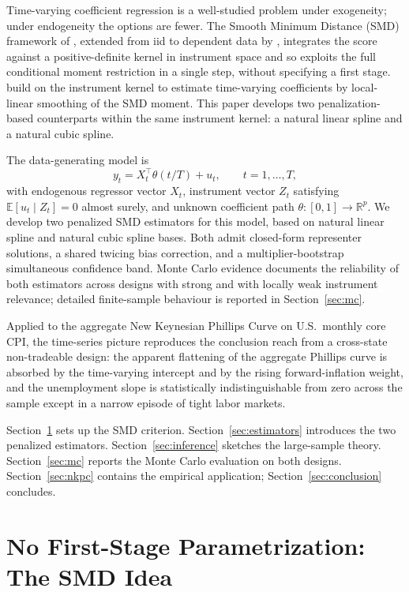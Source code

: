 \documentclass[12pt]{article}
\newcommand{\R}{\mathbb{R}}
\newcommand{\E}{\mathbb{E}}
\begin{document}
Time-varying coefficient regression is a well-studied problem under exogeneity; under endogeneity the options are fewer. The Smooth Minimum Distance (SMD) framework of \citet{Bierens1982}, extended from iid to dependent data by \citet{AntoineSun2024}, integrates the score against a positive-definite kernel in instrument space and so exploits the full conditional moment restriction in a single step, without specifying a first stage. \citet{AntoineShahryarpoor} build on the instrument kernel to estimate time-varying coefficients by local-linear smoothing of the SMD moment. This paper develops two penalization-based counterparts within the same instrument kernel: a natural linear spline and a natural cubic spline.

The data-generating model is
\begin{equation}\label{eq:model}
  y_t = X_t^\top \theta(t/T) + u_t, \qquad t = 1,\ldots,T,
\end{equation}
with endogenous regressor vector $X_t$, instrument vector $Z_t$ satisfying $\E[u_t \mid Z_t] = 0$ almost surely, and unknown coefficient path $\theta : [0,1] \to \R^p$. We develop two penalized SMD estimators for this model, based on natural linear spline and natural cubic spline bases. Both admit closed-form representer solutions, a shared twicing bias correction, and a multiplier-bootstrap simultaneous confidence band. Monte Carlo evidence documents the reliability of both estimators across designs with strong and with locally weak instrument relevance; detailed finite-sample behaviour is reported in Section~\ref{sec:mc}.

Applied to the aggregate New Keynesian Phillips Curve on U.S.\ monthly core CPI, the time-series picture reproduces the conclusion \citet{Hazell2022} reach from a cross-state non-tradeable design: the apparent flattening of the aggregate Phillips curve is absorbed by the time-varying intercept and by the rising forward-inflation weight, and the unemployment slope is statistically indistinguishable from zero across the sample except in a narrow episode of tight labor markets.

Section~\ref{sec:smd} sets up the SMD criterion. Section~\ref{sec:estimators} introduces the two penalized estimators. Section~\ref{sec:inference} sketches the large-sample theory. Section~\ref{sec:mc} reports the Monte Carlo evaluation on both designs. Section~\ref{sec:nkpc} contains the empirical application; Section~\ref{sec:conclusion} concludes.


\section{No First-Stage Parametrization: The SMD Idea}\label{sec:smd}
\end{document}
